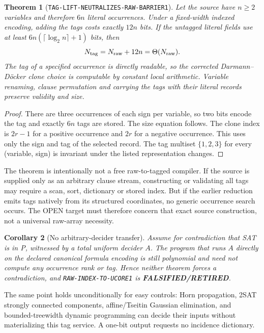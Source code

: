 \documentclass[11pt]{article}
\newtheorem{theorem}{Theorem}
\newtheorem{corollary}[theorem]{Corollary}
\newcommand{\RETIRED}{\textbf{FALSIFIED/RETIRED}}
\begin{document}
\begin{theorem}[\texttt{TAG-LIFT-NEUTRALIZES-RAW-BARRIER1}]
Let the source have $n\ge2$ variables and therefore $6n$ literal
occurrences.  Under a fixed-width indexed encoding, adding the tags costs
exactly $12n$ bits.  If the untagged literal fields use at least
$6n(\lceil\log_2 n\rceil+1)$ bits, then
\[
 N_{\rm tag}=N_{\rm raw}+12n=\Theta(N_{\rm raw}).
\]
The tag of a specified occurrence is directly readable, so the corrected
Darmann--D\"ocker clone choice is computable by constant local arithmetic.
Variable renaming, clause permutation and carrying the tags with their
literal records preserve validity and size.
\end{theorem}
\begin{proof}
There are three occurrences of each sign per variable, so two bits encode
the tag and exactly $6n$ tags are stored.  The size equation follows.  The
clone index is $2r-1$ for a positive occurrence and $2r$ for a negative
occurrence.  This uses only the sign and tag of the selected record.  The
tag multiset $\{1,2,3\}$ for every (variable, sign) is invariant under the
listed representation changes.
\end{proof}

The theorem is intentionally not a free raw-to-tagged compiler.  If the
source is supplied only as an arbitrary clause stream, constructing or
validating all tags may require a scan, sort, dictionary or stored index.
But if the earlier reduction emits tags natively from its structured
coordinates, no generic occurrence search occurs.  The OPEN target must
therefore concern that exact source construction, not a universal raw-array
necessity.

\begin{corollary}[No arbitrary-decider transfer]
Assume for contradiction that SAT is in P, witnessed by a total uniform
decider $A$.  The program that runs $A$ directly on the declared canonical
formula encoding is still polynomial and need not compute any occurrence
rank or tag.  Hence neither theorem forces a contradiction, and
\texttt{RAW-INDEX-TO-UCORE1} is \RETIRED.
\end{corollary}

The same point holds unconditionally for easy controls: Horn propagation,
2SAT strongly connected components, affine/Tseitin Gaussian elimination,
and bounded-treewidth dynamic programming can decide their inputs without
materializing this tag service.  A one-bit output requests no incidence
dictionary.
\end{document}
